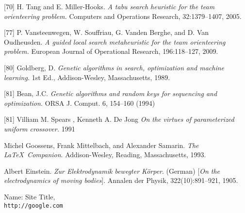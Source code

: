 \begin{thebibliography}{9}
[70] H. Tang and E. Miller-Hooks.
\textit{A tabu search heuristic for the team orienteering problem.}
Computers and Operations Research, 32:1379–1407, 2005.

[77] P. Vansteenwegen, W. Souffriau, G. Vanden Berghe, and D. Van Oudheusden.
\textit{A guided local search metaheuristic for the team orienteering problem.}
European Journal of Operational Research, 196:118–127, 2009.

[80] Goldberg, D.
\textit{Genetic algorithms in search, optimization and machine learning.}
1st Ed., Addison-Wesley, Massachusetts, 1989.

[81] Bean, J.C.
\textit{Genetic algorithms and random keys for sequencing and optimization.}
ORSA J. Comput. 6, 154–160 (1994)

[81] Villiam M. Spears , Kenneth A. De Jong
\textit{On the virtues of parameterized uniform crossover.}
1991




Michel Goossens, Frank Mittelbach, and Alexander Samarin. 
\textit{The \LaTeX\ Companion}. 
Addison-Wesley, Reading, Massachusetts, 1993.
 
Albert Einstein. 
\textit{Zur Elektrodynamik bewegter K{\"o}rper}. (German) 
[\textit{On the electrodynamics of moving bodies}]. 
Annalen der Physik, 322(10):891–921, 1905.
 
Name: Site Title,
\\\texttt{http://google.com}
\end{thebibliography}

